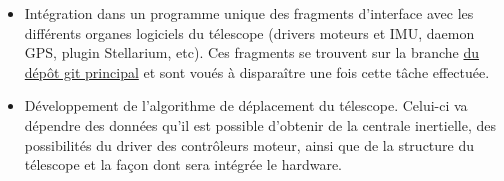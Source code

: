 \begin{itemize}[label=$\bullet$]
	\item Intégration dans un programme unique des fragments d'interface avec les différents organes logiciels du télescope (drivers moteurs et IMU, daemon GPS, plugin Stellarium, etc). Ces fragments se trouvent sur la branche {\href{https://github.com/thibaudledo/Autoscope/tree/master}{ du dépôt git principal}} et sont voués à disparaître une fois cette tâche effectuée.
	\item Développement de l'algorithme de déplacement du télescope. Celui-ci va dépendre des données qu'il est possible d'obtenir de la centrale inertielle, des possibilités du driver des contrôleurs moteur, ainsi que de la structure du télescope et la façon dont sera intégrée le hardware.
	\end{itemize}

